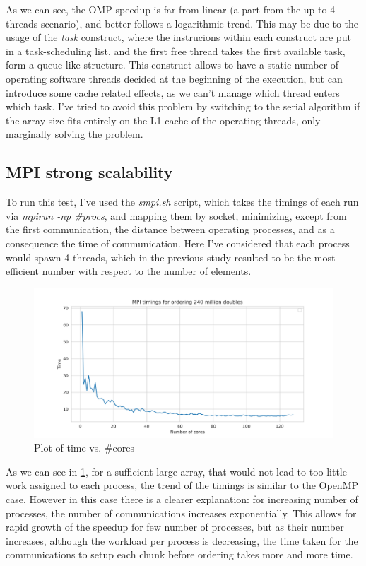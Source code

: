 \documentclass{article}
\begin{document}
	
	As we can see, the OMP speedup is far from linear (a part from the up-to 4 threads scenario), and better follows a logarithmic trend. This may be due to the usage of the \textit{task} construct, where the instrucions within each construct are put in a task-scheduling list, and the first free thread takes the first available task, form a queue-like structure. This construct allows to have a static number of operating software threads decided at the beginning of the execution, but can introduce some cache related effects, as we can't manage which thread enters which task. I've tried to avoid this problem by switching to the serial algorithm if the array size fits entirely on the L1 cache of the operating threads, only marginally solving the problem.
	
	\subsection{MPI strong scalability}
	
	To run this test, I've used the \textit{smpi.sh} script, which takes the timings of each run via \textit{mpirun -np \#procs}, and mapping them by socket, minimizing, except from the first communication, the distance between operating processes, and as a consequence the time of communication. Here I've considered that each process would spawn 4 threads, which in the previous study resulted to be the most efficient number with respect to the number of elements.
	
	\begin{figure}[h]
		\centering
		\includegraphics[width=0.7\linewidth]{../exercise2/plots/smpi_timings}
		\caption[Strong MPI timings]{Plot of time vs. \#cores}
		\label{fig:smpitimings}
	\end{figure}
	
	
	As we can see in \ref{fig:smpitimings}, for a sufficient large array, that would not lead to too little work assigned to each process, the trend of the timings is similar to the OpenMP case.
	However in this case there is a clearer explanation: for increasing number of processes, the number of communications increases exponentially. This allows for rapid growth of the speedup for few number of processes, but as their number increases, although the workload per process is decreasing, the time taken for the communications to setup each chunk before ordering takes more and more time.
	
\end{document}
